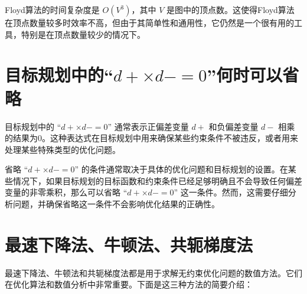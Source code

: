 \documentclass[12pt, a4paper, oneside]{ctexart}
\begin{document}
Floyd算法的时间复杂度是 \( O(V^3) \)，其中 \( V \) 是图中的顶点数。这使得Floyd算法在顶点数量较多时效率不高，但由于其简单性和通用性，它仍然是一个很有用的工具，特别是在顶点数量较少的情况下。

\section{目标规划中的“\( d+ \times d- = 0 \)”何时可以省略}
目标规划中的 “\( d+ \times d- = 0 \)” 通常表示正偏差变量 \( d+ \) 和负偏差变量 \( d- \) 相乘的结果为0。这种表达式在目标规划中用来确保某些约束条件不被违反，或者用来处理某些特殊类型的优化问题。

省略 “\( d+ \times d- = 0 \)” 的条件通常取决于具体的优化问题和目标规划的设置。在某些情况下，如果目标规划的目标函数和约束条件已经足够明确且不会导致任何偏差变量的非零乘积，那么可以省略 “\( d+ \times d- = 0 \)” 这一条件。然而，这需要仔细分析问题，并确保省略这一条件不会影响优化结果的正确性。

\section{最速下降法、牛顿法、共轭梯度法}
最速下降法、牛顿法和共轭梯度法都是用于求解无约束优化问题的数值方法。它们在优化算法和数值分析中非常重要。下面是这三种方法的简要介绍：
\end{document}
